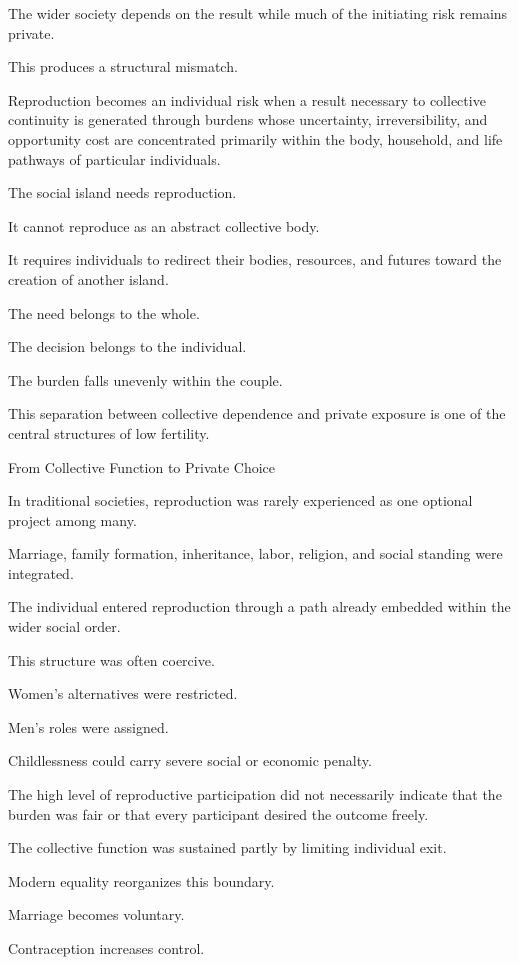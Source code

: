 The wider society depends on the result while much of the initiating risk remains private.

This produces a structural mismatch.

Reproduction becomes an individual risk when a result necessary to collective continuity is generated through burdens whose uncertainty, irreversibility, and opportunity cost are concentrated primarily within the body, household, and life pathways of particular individuals.

The social island needs reproduction.

It cannot reproduce as an abstract collective body.

It requires individuals to redirect their bodies, resources, and futures toward the creation of another island.

The need belongs to the whole.

The decision belongs to the individual.

The burden falls unevenly within the couple.

This separation between collective dependence and private exposure is one of the central structures of low fertility.

From Collective Function to Private Choice

In traditional societies, reproduction was rarely experienced as one optional project among many.

Marriage, family formation, inheritance, labor, religion, and social standing were integrated.

The individual entered reproduction through a path already embedded within the wider social order.

This structure was often coercive.

Women’s alternatives were restricted.

Men’s roles were assigned.

Childlessness could carry severe social or economic penalty.

The high level of reproductive participation did not necessarily indicate that the burden was fair or that every participant desired the outcome freely.

The collective function was sustained partly by limiting individual exit.

Modern equality reorganizes this boundary.

Marriage becomes voluntary.

Contraception increases control.

